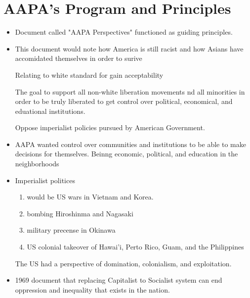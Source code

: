 \documentclass{article}
\begin{document}
\section*{AAPA's Program and Principles}
\begin{itemize}
  \item Document called "AAPA Perspectives" functioned as guiding principles.
  \item This document would note how
    America is still racist and how Asians have accomidated themselves in order to surive

    Relating to white standard for gain acceptability

    The goal to support all non-white liberation movements nd all
    minorities in order to be truly liberated to get control over
    political, economical, and eduational institutions.

    Oppose imperialist policies pursued by American Government.
  \item AAPA wanted control over communities and institutions
    to be able to make decisions for themselves.
    Beinng economic, political, and education in the neighborhoods
  \item Imperialist politices 
    \begin{enumerate}
      \item would be US wars in Vietnam and Korea.
      \item bombing Hiroshinma and Nagasaki
      \item military precense in Okinawa
      \item US colonial takeover of Hawai'i, Perto Rico, Guam, and the Philippines
    \end{enumerate}

    The US had a perspective of domination, colonialism, and exploitation.

  \item 1969 document that replacing Capitalist to Socialist system
    can end oppression and inequality that exists in the nation.


\end{itemize}
\end{document}
